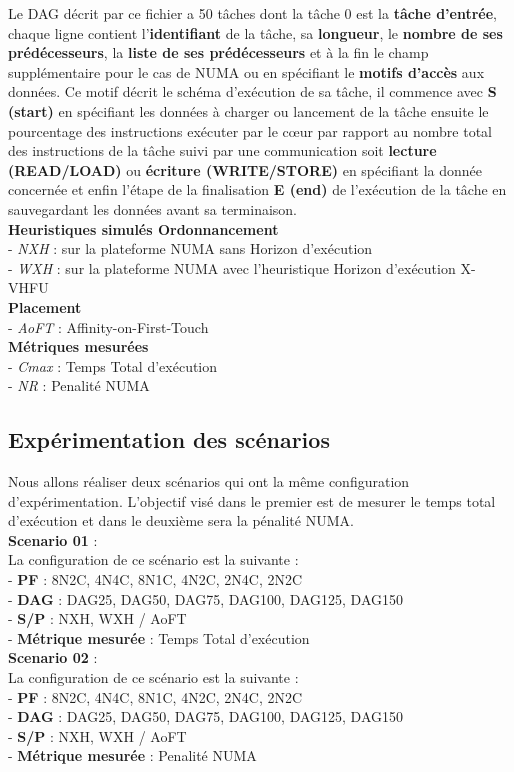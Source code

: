 Le DAG décrit par ce fichier a 50 tâches dont la tâche 0 est la \textbf{tâche d'entrée}, chaque ligne contient l'\textbf{identifiant} de la tâche, sa \textbf{longueur}, le \textbf{nombre de ses prédécesseurs}, la \textbf{liste de ses prédécesseurs} et à la fin le champ supplémentaire pour le cas de NUMA ou en spécifiant le \textbf{motifs d'accès} aux données. Ce motif décrit le schéma d'exécution de sa tâche, il commence avec \textbf{S (start)} en spécifiant les données à charger ou lancement de la tâche ensuite le pourcentage des instructions exécuter par le cœur par rapport au nombre total des instructions de la tâche suivi par une communication soit \textbf{lecture (READ/LOAD)} ou \textbf{écriture (WRITE/STORE)} en spécifiant la donnée concernée et enfin l'étape de la finalisation \textbf{E (end)} de l'exécution de la tâche en sauvegardant les données avant sa terminaison.
\\
\textbf{Heuristiques simulés Ordonnancement}\\   %
- \textit{NXH}   : sur la plateforme NUMA sans Horizon d'exécution \\
- \textit{WXH}  : sur la plateforme NUMA avec l'heuristique Horizon d'exécution X-VHFU
\\
\textbf{Placement}\\
- \textit{AoFT} : Affinity-on-First-Touch
\\
\textbf{Métriques mesurées}\\  %
- \textit{Cmax} : Temps Total d'exécution\\
- \textit{NR} : Penalité NUMA
\subsection{Expérimentation des scénarios}
%
Nous allons réaliser deux scénarios qui ont la même configuration d'expérimentation. L'objectif visé dans le premier est de mesurer le temps total d'exécution et dans le deuxième sera la pénalité NUMA.\\
%
\textbf{Scenario 01} :\\
La configuration de ce scénario est la suivante : \\
- \textbf{PF} : 8N2C, 4N4C, 8N1C, 4N2C, 2N4C, 2N2C\\
- \textbf{DAG} : DAG25, DAG50, DAG75, DAG100, DAG125, DAG150\\
- \textbf{S/P} : NXH, WXH / AoFT\\
- \textbf{Métrique mesurée} : Temps Total d'exécution\\
%
\textbf{Scenario 02} :\\
La configuration de ce scénario est la suivante : \\
- \textbf{PF} : 8N2C, 4N4C, 8N1C, 4N2C, 2N4C, 2N2C\\
- \textbf{DAG} : DAG25, DAG50, DAG75, DAG100, DAG125, DAG150\\
- \textbf{S/P} : NXH, WXH / AoFT\\
- \textbf{Métrique mesurée} : Penalité NUMA\\
%
